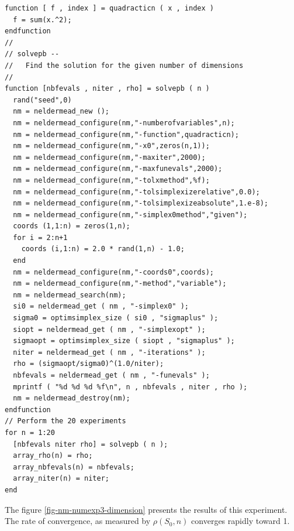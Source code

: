 \lstset{language=scilabscript}
\begin{lstlisting}
function [ f , index ] = quadracticn ( x , index )
  f = sum(x.^2);
endfunction
//
// solvepb --
//   Find the solution for the given number of dimensions
//
function [nbfevals , niter , rho] = solvepb ( n )
  rand("seed",0)
  nm = neldermead_new ();
  nm = neldermead_configure(nm,"-numberofvariables",n);
  nm = neldermead_configure(nm,"-function",quadracticn);
  nm = neldermead_configure(nm,"-x0",zeros(n,1));
  nm = neldermead_configure(nm,"-maxiter",2000);
  nm = neldermead_configure(nm,"-maxfunevals",2000);
  nm = neldermead_configure(nm,"-tolxmethod",%f);
  nm = neldermead_configure(nm,"-tolsimplexizerelative",0.0);
  nm = neldermead_configure(nm,"-tolsimplexizeabsolute",1.e-8);
  nm = neldermead_configure(nm,"-simplex0method","given");
  coords (1,1:n) = zeros(1,n);
  for i = 2:n+1
    coords (i,1:n) = 2.0 * rand(1,n) - 1.0;
  end
  nm = neldermead_configure(nm,"-coords0",coords);
  nm = neldermead_configure(nm,"-method","variable");
  nm = neldermead_search(nm);
  si0 = neldermead_get ( nm , "-simplex0" );
  sigma0 = optimsimplex_size ( si0 , "sigmaplus" );
  siopt = neldermead_get ( nm , "-simplexopt" );
  sigmaopt = optimsimplex_size ( siopt , "sigmaplus" );
  niter = neldermead_get ( nm , "-iterations" );
  rho = (sigmaopt/sigma0)^(1.0/niter);
  nbfevals = neldermead_get ( nm , "-funevals" );
  mprintf ( "%d %d %d %f\n", n , nbfevals , niter , rho );
  nm = neldermead_destroy(nm);
endfunction
// Perform the 20 experiments
for n = 1:20
  [nbfevals niter rho] = solvepb ( n );
  array_rho(n) = rho;
  array_nbfevals(n) = nbfevals;
  array_niter(n) = niter;
end
\end{lstlisting}

The figure \ref{fig-nm-numexp3-dimension} presents the results of this 
experiment. The rate of convergence, as measured by $\rho(S_0,n)$
converges rapidly toward 1.

